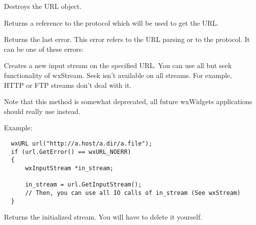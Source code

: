 Destroys the URL object.

%
%
\label{wxurlgetprotocol}


Returns a reference to the protocol which will be used to get the URL.

%
%
\label{wxurlgeterror}


Returns the last error. This error refers to the URL parsing or to the protocol.
It can be one of these errors:

\twocolwidtha{7cm}
\begin{twocollist}\itemsep=0pt%
\end{twocollist}%

%
%
\label{wxurlgetinputstream}


Creates a new input stream on the specified URL. You can use all but seek
functionality of wxStream. Seek isn't available on all streams. For example,
HTTP or FTP streams don't deal with it.

Note that this method is somewhat deprecated, all future wxWidgets applications
should really use  instead.

Example:

\begin{verbatim}
  wxURL url("http://a.host/a.dir/a.file");
  if (url.GetError() == wxURL_NOERR)
  {
      wxInputStream *in_stream;

      in_stream = url.GetInputStream();
      // Then, you can use all IO calls of in_stream (See wxStream)
  }
\end{verbatim}


Returns the initialized stream. You will have to delete it yourself.

